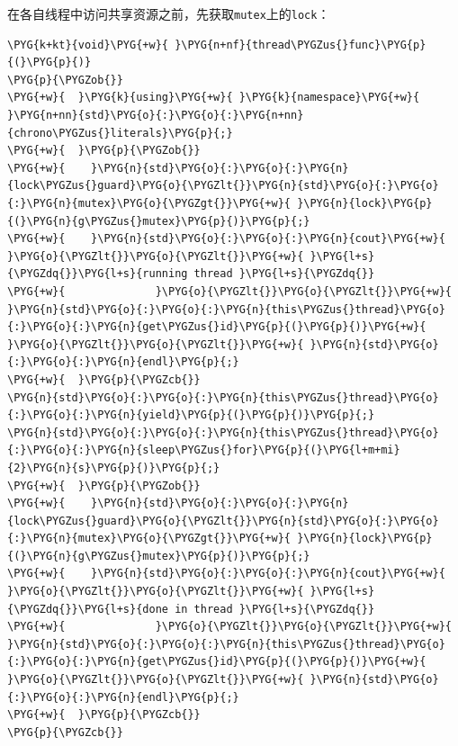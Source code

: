
在各自线程中访问共享资源之前，先获取\texttt{mutex}上的\texttt{lock}：



\begin{codeblockbg}
\begin{Verbatim}[commandchars=\\\{\},breaklines=true,breakanywhere=true,fontsize=\codefont,xleftmargin=17bp]
\PYG{k+kt}{void}\PYG{+w}{ }\PYG{n+nf}{thread\PYGZus{}func}\PYG{p}{(}\PYG{p}{)}
\PYG{p}{\PYGZob{}}
\PYG{+w}{  }\PYG{k}{using}\PYG{+w}{ }\PYG{k}{namespace}\PYG{+w}{ }\PYG{n+nn}{std}\PYG{o}{:}\PYG{o}{:}\PYG{n+nn}{chrono\PYGZus{}literals}\PYG{p}{;}
\PYG{+w}{  }\PYG{p}{\PYGZob{}}
\PYG{+w}{    }\PYG{n}{std}\PYG{o}{:}\PYG{o}{:}\PYG{n}{lock\PYGZus{}guard}\PYG{o}{\PYGZlt{}}\PYG{n}{std}\PYG{o}{:}\PYG{o}{:}\PYG{n}{mutex}\PYG{o}{\PYGZgt{}}\PYG{+w}{ }\PYG{n}{lock}\PYG{p}{(}\PYG{n}{g\PYGZus{}mutex}\PYG{p}{)}\PYG{p}{;}
\PYG{+w}{    }\PYG{n}{std}\PYG{o}{:}\PYG{o}{:}\PYG{n}{cout}\PYG{+w}{ }\PYG{o}{\PYGZlt{}}\PYG{o}{\PYGZlt{}}\PYG{+w}{ }\PYG{l+s}{\PYGZdq{}}\PYG{l+s}{running thread }\PYG{l+s}{\PYGZdq{}}
\PYG{+w}{              }\PYG{o}{\PYGZlt{}}\PYG{o}{\PYGZlt{}}\PYG{+w}{ }\PYG{n}{std}\PYG{o}{:}\PYG{o}{:}\PYG{n}{this\PYGZus{}thread}\PYG{o}{:}\PYG{o}{:}\PYG{n}{get\PYGZus{}id}\PYG{p}{(}\PYG{p}{)}\PYG{+w}{ }\PYG{o}{\PYGZlt{}}\PYG{o}{\PYGZlt{}}\PYG{+w}{ }\PYG{n}{std}\PYG{o}{:}\PYG{o}{:}\PYG{n}{endl}\PYG{p}{;}
\PYG{+w}{  }\PYG{p}{\PYGZcb{}}
\PYG{n}{std}\PYG{o}{:}\PYG{o}{:}\PYG{n}{this\PYGZus{}thread}\PYG{o}{:}\PYG{o}{:}\PYG{n}{yield}\PYG{p}{(}\PYG{p}{)}\PYG{p}{;}
\PYG{n}{std}\PYG{o}{:}\PYG{o}{:}\PYG{n}{this\PYGZus{}thread}\PYG{o}{:}\PYG{o}{:}\PYG{n}{sleep\PYGZus{}for}\PYG{p}{(}\PYG{l+m+mi}{2}\PYG{n}{s}\PYG{p}{)}\PYG{p}{;}
\PYG{+w}{  }\PYG{p}{\PYGZob{}}
\PYG{+w}{    }\PYG{n}{std}\PYG{o}{:}\PYG{o}{:}\PYG{n}{lock\PYGZus{}guard}\PYG{o}{\PYGZlt{}}\PYG{n}{std}\PYG{o}{:}\PYG{o}{:}\PYG{n}{mutex}\PYG{o}{\PYGZgt{}}\PYG{+w}{ }\PYG{n}{lock}\PYG{p}{(}\PYG{n}{g\PYGZus{}mutex}\PYG{p}{)}\PYG{p}{;}
\PYG{+w}{    }\PYG{n}{std}\PYG{o}{:}\PYG{o}{:}\PYG{n}{cout}\PYG{+w}{ }\PYG{o}{\PYGZlt{}}\PYG{o}{\PYGZlt{}}\PYG{+w}{ }\PYG{l+s}{\PYGZdq{}}\PYG{l+s}{done in thread }\PYG{l+s}{\PYGZdq{}}
\PYG{+w}{              }\PYG{o}{\PYGZlt{}}\PYG{o}{\PYGZlt{}}\PYG{+w}{ }\PYG{n}{std}\PYG{o}{:}\PYG{o}{:}\PYG{n}{this\PYGZus{}thread}\PYG{o}{:}\PYG{o}{:}\PYG{n}{get\PYGZus{}id}\PYG{p}{(}\PYG{p}{)}\PYG{+w}{ }\PYG{o}{\PYGZlt{}}\PYG{o}{\PYGZlt{}}\PYG{+w}{ }\PYG{n}{std}\PYG{o}{:}\PYG{o}{:}\PYG{n}{endl}\PYG{p}{;}
\PYG{+w}{  }\PYG{p}{\PYGZcb{}}
\PYG{p}{\PYGZcb{}}
\end{Verbatim}
\end{codeblockbg}


